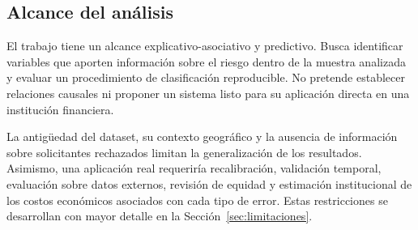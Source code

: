 \subsection{Alcance del análisis}

El trabajo tiene un alcance explicativo-asociativo y predictivo. Busca
identificar variables que aporten información sobre el riesgo dentro de
la muestra analizada y evaluar un procedimiento de clasificación
reproducible. No pretende establecer relaciones causales ni proponer un
sistema listo para su aplicación directa en una institución financiera.

La antigüedad del dataset, su contexto geográfico y la ausencia de
información sobre solicitantes rechazados limitan la generalización de
los resultados. Asimismo, una aplicación real requeriría recalibración,
validación temporal, evaluación sobre datos externos, revisión de
equidad y estimación institucional de los costos económicos asociados
con cada tipo de error. Estas restricciones se desarrollan con mayor
detalle en la Sección~\ref{sec:limitaciones}.

